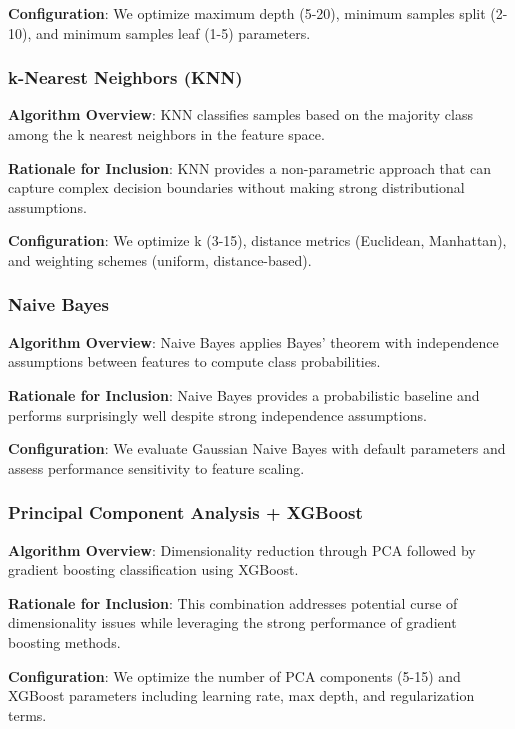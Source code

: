 \documentclass[
  12pt,
  a4paper,
]{report}
\begin{document}
\textbf{Configuration}: We optimize maximum depth (5-20), minimum
samples split (2-10), and minimum samples leaf (1-5) parameters.

\subsubsection{k-Nearest Neighbors (KNN)}\label{k-nearest-neighbors-knn}

\textbf{Algorithm Overview}: KNN classifies samples based on the
majority class among the k nearest neighbors in the feature space.

\textbf{Rationale for Inclusion}: KNN provides a non-parametric approach
that can capture complex decision boundaries without making strong
distributional assumptions.

\textbf{Configuration}: We optimize k (3-15), distance metrics
(Euclidean, Manhattan), and weighting schemes (uniform, distance-based).

\subsubsection{Naive Bayes}\label{naive-bayes}

\textbf{Algorithm Overview}: Naive Bayes applies Bayes' theorem with
independence assumptions between features to compute class
probabilities.

\textbf{Rationale for Inclusion}: Naive Bayes provides a probabilistic
baseline and performs surprisingly well despite strong independence
assumptions.

\textbf{Configuration}: We evaluate Gaussian Naive Bayes with default
parameters and assess performance sensitivity to feature scaling.

\subsubsection{Principal Component Analysis +
XGBoost}\label{principal-component-analysis-xgboost}

\textbf{Algorithm Overview}: Dimensionality reduction through PCA
followed by gradient boosting classification using XGBoost.

\textbf{Rationale for Inclusion}: This combination addresses potential
curse of dimensionality issues while leveraging the strong performance
of gradient boosting methods.

\textbf{Configuration}: We optimize the number of PCA components (5-15)
and XGBoost parameters including learning rate, max depth, and
regularization terms.
\end{document}
